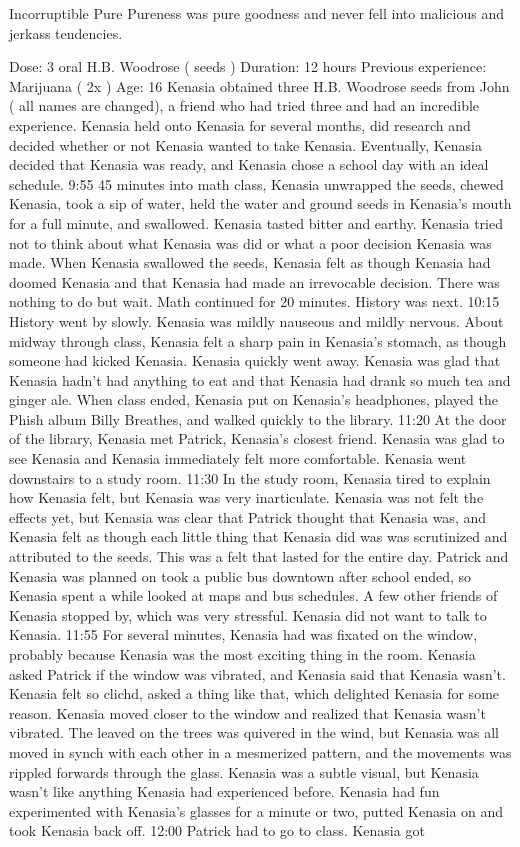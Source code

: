 \documentclass[12pt]{book}
\begin{document}
Incorruptible Pure Pureness was pure goodness and never fell into malicious and jerkass tendencies.



Dose: 3 oral H.B. Woodrose ( seeds ) Duration: 12 hours Previous experience: Marijuana ( 2x ) Age: 16 Kenasia obtained three H.B. Woodrose seeds from John ( all names are changed), a friend who had tried three and had an incredible experience. Kenasia held onto Kenasia for several months, did research and decided whether or not Kenasia wanted to take Kenasia. Eventually, Kenasia decided that Kenasia was ready, and Kenasia chose a school day with an ideal schedule. 9:55 45 minutes into math class, Kenasia unwrapped the seeds, chewed Kenasia, took a sip of water, held the water and ground seeds in Kenasia's mouth for a full minute, and swallowed. Kenasia tasted bitter and earthy. Kenasia tried not to think about what Kenasia was did or what a poor decision Kenasia was made. When Kenasia swallowed the seeds, Kenasia felt as though Kenasia had doomed Kenasia and that Kenasia had made an irrevocable decision. There was nothing to do but wait. Math continued for 20 minutes. History was next. 10:15 History went by slowly. Kenasia was mildly nauseous and mildly nervous. About midway through class, Kenasia felt a sharp pain in Kenasia's stomach, as though someone had kicked Kenasia. Kenasia quickly went away. Kenasia was glad that Kenasia hadn't had anything to eat and that Kenasia had drank so much tea and ginger ale. When class ended, Kenasia put on Kenasia's headphones, played the Phish album Billy Breathes, and walked quickly to the library. 11:20 At the door of the library, Kenasia met Patrick, Kenasia's closest friend. Kenasia was glad to see Kenasia and Kenasia immediately felt more comfortable. Kenasia went downstairs to a study room. 11:30 In the study room, Kenasia tired to explain how Kenasia felt, but Kenasia was very inarticulate. Kenasia was not felt the effects yet, but Kenasia was clear that Patrick thought that Kenasia was, and Kenasia felt as though each little thing that Kenasia did was was scrutinized and attributed to the seeds. This was a felt that lasted for the entire day. Patrick and Kenasia was planned on took a public bus downtown after school ended, so Kenasia spent a while looked at maps and bus schedules. A few other friends of Kenasia stopped by, which was very stressful. Kenasia did not want to talk to Kenasia. 11:55 For several minutes, Kenasia had was fixated on the window, probably because Kenasia was the most exciting thing in the room. Kenasia asked Patrick if the window was vibrated, and Kenasia said that Kenasia wasn't. Kenasia felt so clichd, asked a thing like that, which delighted Kenasia for some reason. Kenasia moved closer to the window and realized that Kenasia wasn't vibrated. The leaved on the trees was quivered in the wind, but Kenasia was all moved in synch with each other in a mesmerized pattern, and the movements was rippled forwards through the glass. Kenasia was a subtle visual, but Kenasia wasn't like anything Kenasia had experienced before. Kenasia had fun experimented with Kenasia's glasses for a minute or two, putted Kenasia on and took Kenasia back off. 12:00 Patrick had to go to class. Kenasia got 
\end{document}
